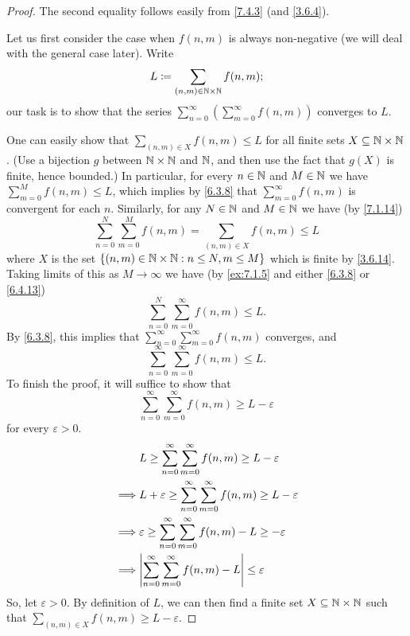 \begin{proof}
  The second equality follows easily from \cref{7.4.3} (and \cref{3.6.4}).

  Let us first consider the case when \(f(n, m)\) is always non-negative (we will deal with the general case later).
  Write
  \[
    L \coloneqq \sum_{(n, m) \in \mathbb{N} \times \mathbb{N}} f(n, m);
  \]
  our task is to show that the series \(\sum_{n = 0}^\infty (\sum_{m = 0}^\infty f(n, m))\) converges to \(L\).

  One can easily show that \(\sum_{(n, m) \in X} f(n, m) \leq L\) for all finite sets \(X \subseteq \mathbb{N} \times \mathbb{N}\).
  (Use a bijection \(g\) between \(\mathbb{N} \times \mathbb{N}\) and \(\mathbb{N}\), and then use the fact that \(g(X)\) is finite, hence bounded.)
  In particular, for every \(n \in \mathbb{N}\) and \(M \in \mathbb{N}\) we have \(\sum_{m = 0}^M f(n, m) \leq L\), which implies by \cref{6.3.8} that \(\sum_{m = 0}^\infty f(n, m)\) is convergent for each \(n\).
  Similarly, for any \(N \in \mathbb{N}\) and \(M \in \mathbb{N}\) we have (by \cref{7.1.14})
  \[
    \sum_{n = 0}^N \sum_{m = 0}^M f(n, m) = \sum_{(n, m) \in X} f(n, m) \leq L
  \]
  where \(X\) is the set \(\left\lbrace(n,m) \in \mathbb{N} \times \mathbb{N} : n \leq N, m \leq M\right\rbrace\) which is finite by \cref{3.6.14}.
  Taking limits of this as \(M \to \infty\) we have (by \cref{ex:7.1.5} and either \cref{6.3.8} or \cref{6.4.13})
  \[
    \sum_{n = 0}^N \sum_{m = 0}^\infty f(n, m) \leq L.
  \]
  By \cref{6.3.8}, this implies that \(\sum_{n = 0}^\infty \sum_{m = 0}^\infty f(n, m)\) converges, and
  \[
    \sum_{n = 0}^\infty \sum_{m = 0}^\infty f(n, m) \leq L.
  \]
  To finish the proof, it will suffice to show that
  \[
    \sum_{n = 0}^\infty \sum_{m = 0}^\infty f(n, m) \geq L - \varepsilon
  \]
  for every \(\varepsilon > 0\).
  \begin{align*}
             & L \geq \sum_{n = 0}^\infty \sum_{m = 0}^\infty f(n, m) \geq L - \varepsilon               \\
    \implies & L + \varepsilon \geq \sum_{n = 0}^\infty \sum_{m = 0}^\infty f(n, m) \geq L - \varepsilon \\
    \implies & \varepsilon \geq \sum_{n = 0}^\infty \sum_{m = 0}^\infty f(n, m) - L \geq -\varepsilon    \\
    \implies & \abs{\sum_{n = 0}^\infty \sum_{m = 0}^\infty f(n, m) - L} \leq \varepsilon                \\
  \end{align*}
  So, let \(\varepsilon > 0\).
  By definition of \(L\), we can then find a finite set \(X \subseteq \mathbb{N} \times \mathbb{N}\) such that \(\sum_{(n, m) \in X} f(n, m) \geq L - \varepsilon\).

\end{proof}
